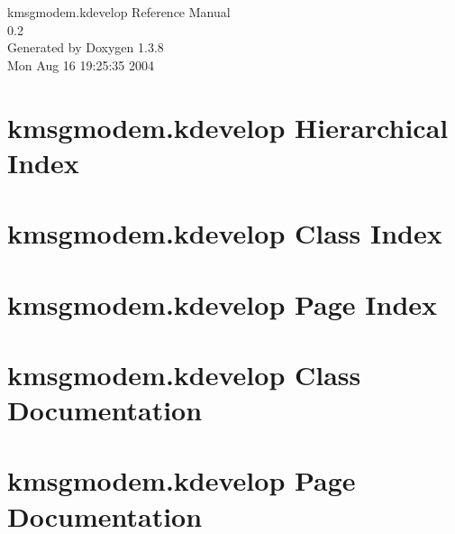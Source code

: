 \documentclass[a4paper]{book}
\begin{document}
\begin{titlepage}
\vspace*{7cm}
\begin{center}
{\Large kmsgmodem.kdevelop Reference Manual\\[1ex]\large 0.2 }\\
\vspace*{1cm}
{\large Generated by Doxygen 1.3.8}\\
\vspace*{0.5cm}
{\small Mon Aug 16 19:25:35 2004}\\
\end{center}
\end{titlepage}
\clearemptydoublepage
{}
\tableofcontents
\clearemptydoublepage
{}
\chapter{kmsgmodem.kdevelop Hierarchical Index}

\chapter{kmsgmodem.kdevelop Class Index}

\chapter{kmsgmodem.kdevelop Page Index}

\chapter{kmsgmodem.kdevelop Class Documentation}







\chapter{kmsgmodem.kdevelop Page Documentation}

\printindex
\end{document}
